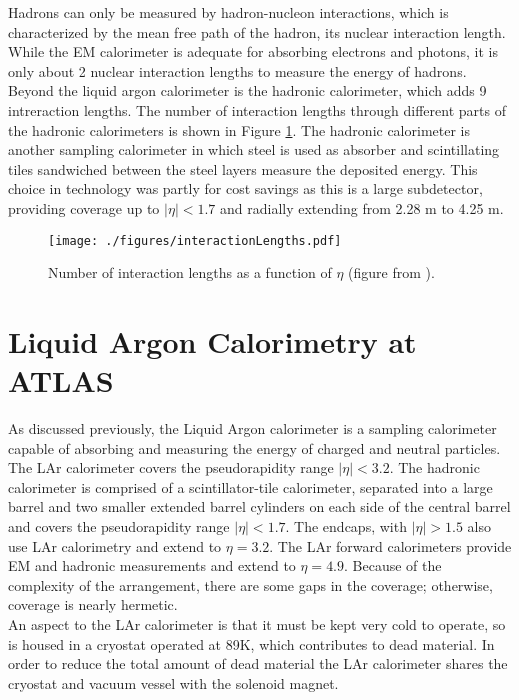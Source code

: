 Hadrons can only be measured by hadron-nucleon interactions, which is characterized by the mean free path of the hadron, its nuclear interaction length.  While the EM calorimeter is adequate for absorbing electrons and photons, it is only about 2 nuclear interaction lengths to measure the energy of hadrons.  Beyond the liquid argon calorimeter is the hadronic calorimeter, which adds 9 intreraction lengths.  The number of interaction lengths through different parts of the hadronic calorimeters is shown in Figure \ref{fig:interactionLengths}.  The hadronic calorimeter is another sampling calorimeter in which steel is used as absorber and scintillating tiles sandwiched between the steel layers measure the deposited energy.  This choice in technology was partly for cost savings as this is a large subdetector, providing coverage up to $|\eta|<1.7$ and radially extending from 2.28 m to 4.25 m.  \\

\begin{figure}[h!]
  \centering
	\texttt{[image: ./figures/interactionLengths.pdf]}
\caption[Number of interaction lengths as a function of $\eta$]{\label{fig:interactionLengths}{ Number of interaction lengths as a function of $\eta$ (figure from \cite{DetectorPaper:2008}). }} %
\end{figure}

\section{Liquid Argon Calorimetry at ATLAS}

As discussed previously, the Liquid Argon calorimeter is a sampling calorimeter capable of absorbing and measuring the energy of charged and neutral particles.  The LAr calorimeter covers the pseudorapidity range $|\eta| < 3.2$.  The hadronic calorimeter is comprised of a scintillator-tile calorimeter, separated into a large barrel and two smaller extended barrel cylinders on each side of the central barrel and covers the pseudorapidity range $|\eta| < 1.7$.  The endcaps, with $|\eta| > 1.5$ also use LAr calorimetry and extend to $\eta = 3.2$.  The LAr forward calorimeters provide EM and hadronic measurements and extend to $\eta = 4.9$.  Because of the complexity of the arrangement, there are some gaps in the coverage; otherwise, coverage is nearly hermetic.  \\

An aspect to the LAr calorimeter is that it must be kept very cold to operate, so is housed in a cryostat operated at 89K, which contributes to dead material.  In order to reduce the total amount of dead material the LAr calorimeter shares the cryostat and vacuum vessel with the solenoid magnet.  \\

